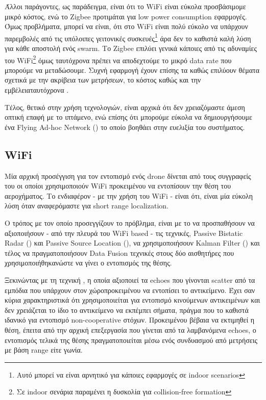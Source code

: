 Άλλοι παράγοντες, ως παράδειγμα, είναι ότι το WiFi είναι εύκολα προσβάσιμο\udot με μικρό κόστος, ενώ το Zigbee προτιμάται για low power consumption εφαρμογές. Όμως προβλήματα, μπορεί να είναι, ότι στο WiFi είναι πολύ εύκολο να υπάρχουν παρεμβολές από τις υπόλοιπες γειτονικές 
συσκευές\footnote{Αυτό μπορεί να είναι αρνητικό για κάποιες εφαρμογές σε indoor scenarios} 
άρα δεν το καθιστά καλή λύση για κάθε αποστολή ενός swarm. Το Zigbee επιλύει γενικά κάποιες από τις αδυναμίες του WiFi\footnote{Σε indoor σενάρια παραμένει η δυσκολία για collision-free formation} όμως ταυτόχρονα πρέπει να αποδεχτούμε το μικρό data rate που μπορούμε να μεταδώσουμε. 
Συχνή εφαρμογή έχουν επίσης τα  καθώς επιλύουν θέματα σχετικά με την ακρίβεια των μετρήσεων, 
το κόστος καθώς και την εμβέλεια\udot ταυτόχρονα \cite{uwb-imu-gps3}. 

Τέλος, θετικό στην χρήση  τεχνολογιών, είναι αρχικά ότι δεν χρειαζόμαστε άμεση οπτική επαφή με το ιπτάμενο, ενώ επίσης ότι μπορούμε εύκολα να δημιουργήσουμε
ένα Flying Ad-hoc Network () το οποίο βοηθάει στην ευελιξία του συστήματος.

\subsection{WiFi}
Μία αρχική προσέγγιση για τον εντοπισμό ενός drone δίνεται από τους συγγραφείς του \cite{wifi-passive-active-drone-localization}
οι οποίοι χρησιμοποιούν WiFi προκειμένου να εντοπίσουν την θέση του αεροχήματος. Το ενδιαφέρον - με την χρήση του WiFi - είναι ότι, 
είναι μία εύκολη λύση όταν αναφερόμαστε για short range localization. 

Ο τρόπος με τον οποίο προσεγγίζουν το πρόβλημα, είναι με 
το να προσπαθήσουν να αξιοποιήσουν - από την πλευρά του WiFi based - τις τεχνικές, 
Passive Bistatic Radar () και Passive Source Location (), να χρησιμοποιήσουν Kalman Filter ()
και τέλος να πραγματοποιήσουν Data Fusion τεχνικές στους δύο αισθητήρες που χρησιμοποιήθηκαν\udot ώστε να γίνει ο εντοπισμός της θέσης.

Ξεκινώντας με τη τεχνική , η οποία αξιοποιεί τα echoes που
γίνονται scatter από τα εμπόδια που υπάρχουν στον χώρο\udot προκειμένου να εντοπίσει το αντικείμενο. Έχει σαν κύρια χαρακτηριστικά 
ότι χρησιμοποιείται για εντοπισμό κινούμενων α\-ντι\-κειμένων και δεν χρειάζεται το ίδιο το αντικείμενο να εκπέμπει σήματα, πράγμα που 
το καθιστά ιδανικό για εντοπισμό non-cooperative στόχων. Προκειμένου βέβαια να εκτιμηθεί η θέση, έπειτα από την αρχική επεξεργασία 
που γίνεται από τα λαμβανόμενα echoes, ο εντοπισμός τελικά της θέσης πραγματοποιείται μέσω ενός συνδυασμού από μετρήσεις με βάση 
range είτε γωνία. 

